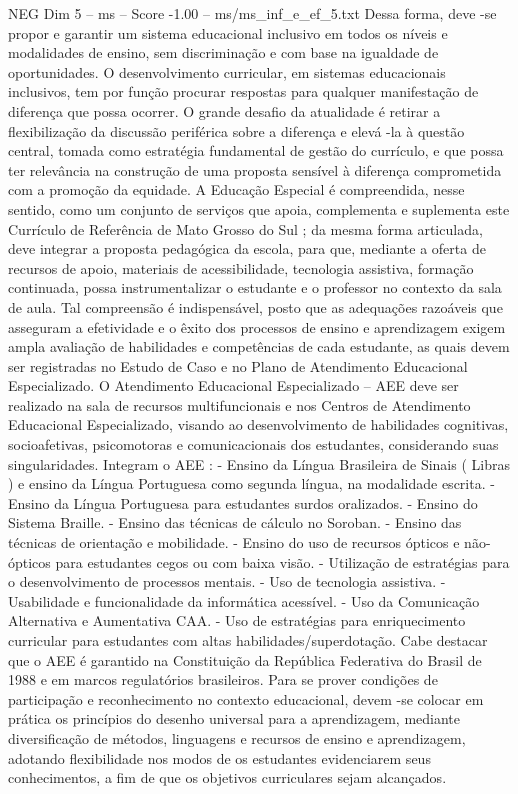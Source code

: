 \begin{textsample}{NEG Dim 5 – ms – Score -1.00 – ms/ms\_inf\_e\_ef\_5.txt}
Dessa forma, deve -se propor e garantir um sistema educacional inclusivo em todos os níveis e modalidades de ensino, sem discriminação e com base na igualdade de oportunidades.
O desenvolvimento curricular, em sistemas educacionais inclusivos, tem por função procurar respostas para qualquer manifestação de diferença que possa ocorrer.
O grande desafio da atualidade é retirar a flexibilização da discussão periférica sobre a diferença e elevá -la à questão central, tomada como estratégia fundamental de gestão do currículo, e que possa ter relevância na construção de uma proposta sensível à diferença comprometida com a promoção da equidade.
A Educação Especial é compreendida, nesse sentido, como um conjunto de serviços que apoia, complementa e suplementa este Currículo de Referência de Mato Grosso do Sul ; da mesma forma articulada, deve integrar a proposta pedagógica da escola, para que, mediante a oferta de recursos de apoio, materiais de acessibilidade, tecnologia assistiva, formação continuada, possa instrumentalizar o estudante e o professor no contexto da sala de aula.
Tal compreensão é indispensável, posto que as adequações razoáveis que asseguram a efetividade e o êxito dos processos de ensino e aprendizagem exigem ampla avaliação de habilidades e competências de cada estudante, as quais devem ser registradas no Estudo de Caso e no Plano de Atendimento Educacional Especializado.
O Atendimento Educacional Especializado – AEE deve ser realizado na sala de recursos multifuncionais e nos Centros de Atendimento Educacional Especializado, visando ao desenvolvimento de habilidades cognitivas, socioafetivas, psicomotoras e comunicacionais dos estudantes, considerando suas singularidades.
Integram o AEE : - Ensino da Língua Brasileira de Sinais ( Libras ) e ensino da Língua Portuguesa como segunda língua, na modalidade escrita. - Ensino da Língua Portuguesa para estudantes surdos oralizados. - Ensino do Sistema Braille. - Ensino das técnicas de cálculo no Soroban. - Ensino das técnicas de orientação e mobilidade. - Ensino do uso de recursos ópticos e não-ópticos para estudantes cegos ou com baixa visão. - Utilização de estratégias para o desenvolvimento de processos mentais. - Uso de tecnologia assistiva. - Usabilidade e funcionalidade da informática acessível. - Uso da Comunicação Alternativa e Aumentativa CAA. - Uso de estratégias para enriquecimento curricular para estudantes com altas habilidades/superdotação.
Cabe destacar que o AEE é garantido na Constituição da República Federativa do Brasil de 1988 e em marcos regulatórios brasileiros.
Para se prover condições de participação e reconhecimento no contexto educacional, devem -se colocar em prática os princípios do desenho universal para a aprendizagem, mediante diversificação de métodos, linguagens e recursos de ensino e aprendizagem, adotando flexibilidade nos modos de os estudantes evidenciarem seus conhecimentos, a fim de que os objetivos curriculares sejam alcançados.

\end{textsample}
